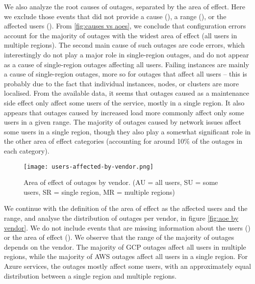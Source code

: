 We also analyze the root causes of outages, separated by the area of effect.
Here we exclude those events that did not provide a cause (), a range (), or the affected users ().
From \autoref{fig:causes vs aoes}, we conclude that configuration errors account for the majority of outages with the widest area of effect (all users in multiple regions).
The second main cause of such outages are code errors, which interestingly do not play a major role in single-region outages, and do not appear as a cause of single-region outages affecting all users.
Failing instances are mainly a cause of single-region outages, more so for outages that affect all users -- this is probably due to the fact that individual instances, nodes, or clusters are more localised. %
From the available data, it seems that outages caused as a maintenance side effect only affect some users of the service, mostly in a single region.
It also appears that outages caused by increased load more commonly affect only some users in a given range.
The majority of outages caused by network issues affect some users in a single region, though they also play a somewhat significant role in the other area of effect categories (accounting for around 10\% of the outages in each category).

\begin{figure}[h]
  \centering
  \texttt{[image: users-affected-by-vendor.png]}
  \caption{Area of effect of outages by vendor. (AU = all users, SU = some users, SR = single region, MR = multiple regions)}
  \label{fig:aoe by vendor}
\end{figure}

We continue with the definition of the area of effect as the affected users and the range, and analyse the distribution of outages per vendor, in figure \autoref{fig:aoe by vendor}.
We do not include events that are missing information about the users () or the area of effect ().
We observe that the range of the majority of outages depends on the vendor.
The majority of GCP outages affect all users in multiple regions, while the majority of AWS outages affect all users in a single region.
For Azure services, the outages mostly affect some users, with an approximately equal distribution between a single region and multiple regions.

